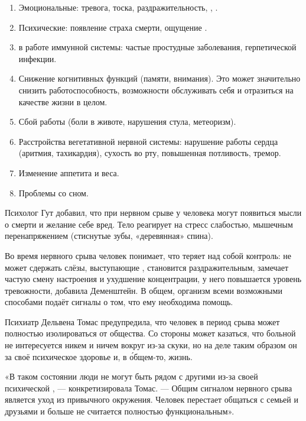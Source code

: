 \begin{enumerate}
    \item Эмоциональные: тревога, тоска, раздражительность, , .
    \item Психические: появление страха смерти, ощущение .
    \item {} в работе иммунной системы: частые простудные заболевания,  герпетической инфекции.
    \item Снижение когнитивных функций (памяти, внимания). Это может значительно снизить работоспособность,  возможности обслуживать себя и отразиться на качестве жизни в целом.
    \item Сбой работы  (боли в животе, нарушения стула, метеоризм).
    \item Расстройства вегетативной нервной системы: нарушение работы сердца (аритмия, тахикардия), сухость во рту, повышенная потливость, тремор.
    \item Изменение аппетита и веса.
    \item Проблемы со сном.
\end{enumerate}

Психолог Гут добавил, что при нервном срыве у человека могут появиться мысли о смерти и желание  себе вред. Тело реагирует на стресс слабостью, мышечным перенапряжением (стиснутые зубы, «деревянная» спина).

Во время нервного срыва человек понимает, что теряет над собой контроль: не может сдержать слёзы, выступающие , становится раздражительным, замечает частую смену настроения и ухудшение концентрации, у него повышается уровень тревожности, добавила Деменштейн. В общем, организм всеми возможными способами подаёт сигналы о том, что ему необходима помощь.

Психиатр Дельвена Томас предупредила, что человек в период срыва может полностью изолироваться от общества. Со стороны может казаться, что больной не интересуется никем и ничем вокруг из-за скуки, но на деле таким образом он  за своё психическое здоровье и, в \'{о}бщем-то, жизнь.

«В таком состоянии люди не могут быть рядом с другими из-за своей психической ,  ---  конкретизировала Томас.  ---  Общим сигналом нервного срыва является уход из привычного окружения. Человек перестает общаться с семьей и друзьями и больше не считается полностью функциональным».


